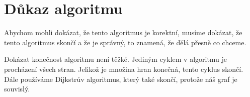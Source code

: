 \section{Důkaz algoritmu}
\label{dukaz_algoritmu}

Abychom mohli dokázat, že tento algoritmus je korektní, musíme dokázat, že tento algoritmus skončí a že je správný, to znamená, že dělá přesně co chceme.

Dokázat konečnost algoritmu není těžké. Jediným cyklem v algoritmu je procházení všech stran. Jelikož je množina hran konečná, tento cyklus skončí.  Dále používáme Dijkstrův algoritmus, který také skončí, protože náš graf je souvislý. 
